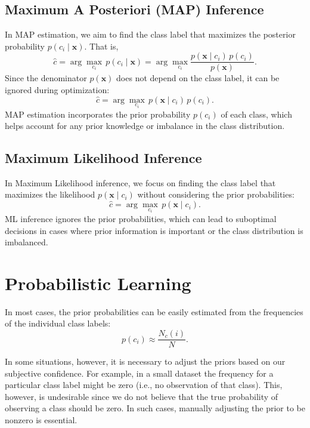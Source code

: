 \documentclass[12pt]{article}
\begin{document}
\subsection*{Maximum A Posteriori (MAP) Inference}

In MAP estimation, we aim to find the class label that maximizes the posterior probability \(p(c_i \mid \bm{x})\). That is,
\begin{equation}
\hat{c} = \arg\max_{c_i} \, p(c_i \mid \bm{x}) = \arg\max_{c_i} \frac{p(\bm{x} \mid c_i) \, p(c_i)}{p(\bm{x})}.
\end{equation}
Since the denominator \(p(\bm{x})\) does not depend on the class label, it can be ignored during optimization:
\begin{equation}
\hat{c} = \arg\max_{c_i} \, p(\bm{x} \mid c_i) \, p(c_i).
\end{equation}
MAP estimation incorporates the prior probability \(p(c_i)\) of each class, which helps account for any prior knowledge or imbalance in the class distribution.

\subsection*{Maximum Likelihood Inference}

In Maximum Likelihood inference, we focus on finding the class label that maximizes the likelihood \(p(\bm{x} \mid c_i)\) without considering the prior probabilities:
\begin{equation}
\hat{c} = \arg\max_{c_i} \, p(\bm{x} \mid c_i).
\end{equation}
ML inference ignores the prior probabilities, which can lead to suboptimal decisions in cases where prior information is important or the class distribution is imbalanced.

\section{Probabilistic Learning}
In most cases, the prior probabilities can be easily estimated from the frequencies of the individual class labels:
\begin{equation}
    p(c_i) \approx \frac{N_c(i)}{N}.
\end{equation}

In some situations, however, it is necessary to adjust the priors based on our subjective confidence. For example, in a small dataset the frequency for a particular class label might be zero (i.e., no observation of that class). This, however, is undesirable since we do not believe that the true probability of observing a class should be zero. In such cases, manually adjusting the prior to be nonzero is essential.
\end{document}
